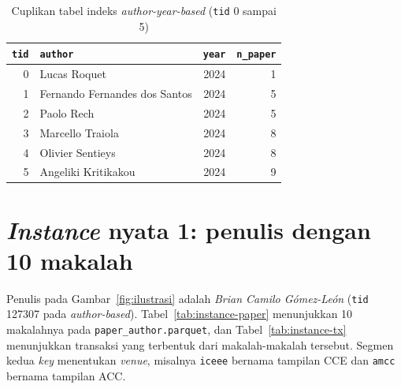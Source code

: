 \begin{table}[!htb]
\caption{Cuplikan tabel indeks \textit{author-year-based} (\texttt{tid} 0 sampai 5)}
\label{tab:cuplikan-index}
\small
\begin{tabular*}{\textwidth}{@{\extracolsep{\fill}}@{}rlrr@{}}
\toprule
\textbf{\texttt{tid}} & \textbf{\texttt{author}} & \textbf{\texttt{year}} & \textbf{\texttt{n\_paper}} \\
\midrule
0 & Lucas Roquet & 2024 & 1 \\
1 & Fernando Fernandes dos Santos & 2024 & 5 \\
2 & Paolo Rech & 2024 & 5 \\
3 & Marcello Traiola & 2024 & 8 \\
4 & Olivier Sentieys & 2024 & 8 \\
5 & Angeliki Kritikakou & 2024 & 9 \\
\bottomrule
\end{tabular*}
\end{table}

\section{\textit{Instance} nyata 1: penulis dengan 10 makalah}
\label{sec:instance1}
Penulis pada Gambar~\ref{fig:ilustrasi} adalah \textit{Brian Camilo Gómez-León} (\texttt{tid} 127307 pada \textit{author-based}). Tabel~\ref{tab:instance-paper} menunjukkan 10 makalahnya pada \texttt{paper\_author.parquet}, dan Tabel~\ref{tab:instance-tx} menunjukkan transaksi yang terbentuk dari makalah-makalah tersebut. Segmen kedua \textit{key} menentukan \textit{venue}, misalnya \texttt{iceee} bernama tampilan CCE dan \texttt{amcc} bernama tampilan ACC.

